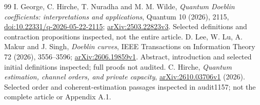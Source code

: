 \documentclass[11pt]{article}
\theoremstyle{remark}\newtheorem{remark}[theorem]{Remark}
\begin{document}
\begin{thebibliography}{99}
 I. George, C. Hirche, T. Nuradha and M. M. Wilde, \emph{Quantum Doeblin coefficients: interpretations and applications}, Quantum 10 (2026), 2115, \href{https://doi.org/10.22331/q-2026-05-22-2115}{doi:10.22331/q-2026-05-22-2115}; \href{https://arxiv.org/abs/2503.22823v3}{arXiv:2503.22823v3}. Selected definitions and contraction propositions inspected, not the entire article.
 D. Lee, W. Lu, A. Makur and J. Singh, \emph{Doeblin curves}, IEEE Transactions on Information Theory 72 (2026), 3556--3596; \href{https://arxiv.org/abs/2606.19859v1}{arXiv:2606.19859v1}. Abstract, introduction and selected initial definitions inspected; full proofs not audited.
 C. Hirche, \emph{Quantum estimation, channel orders, and private capacity}, \href{https://arxiv.org/abs/2610.03706v1}{arXiv:2610.03706v1} (2026). Selected order and coherent-estimation passages inspected in audit1157; not the complete article or Appendix A.1.
\end{thebibliography}
\end{document}
